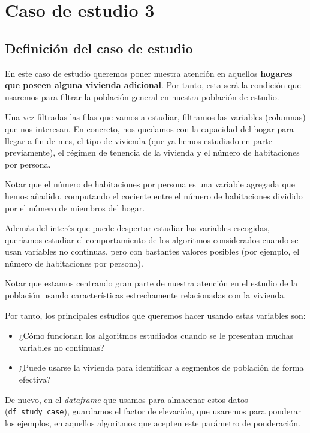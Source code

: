 \documentclass[11pt]{article}
\begin{document}
\pagebreak

\section{Caso de estudio 3}

\subsection{Definición del caso de estudio}

En este caso de estudio queremos poner nuestra atención en aquellos \textbf{hogares que poseen alguna vivienda adicional}. Por tanto, esta será la condición que usaremos para filtrar la población general en nuestra población de estudio.

Una vez filtradas las filas que vamos a estudiar, filtramos las variables (columnas) que nos interesan. En concreto, nos quedamos con la capacidad del hogar para llegar a fin de mes, el tipo de vivienda (que ya hemos estudiado en parte previamente), el régimen de tenencia de la vivienda y el número de habitaciones por persona.

Notar que el número de habitaciones por persona es una variable agregada que hemos añadido, computando el cociente entre el número de habitaciones dividido por el número de miembros del hogar.

Además del interés que puede despertar estudiar las variables escogidas, queríamos estudiar el comportamiento de los algoritmos considerados cuando se usan variables no continuas, pero con bastantes valores posibles (por ejemplo, el número de habitaciones por persona).

Notar que estamos centrando gran parte de nuestra atención en el estudio de la población usando características estrechamente relacionadas con la vivienda.

Por tanto, los principales estudios que queremos hacer usando estas variables son:

\begin{itemize}
    \item ¿Cómo funcionan los algoritmos estudiados cuando se le presentan muchas variables no continuas?
    \item ¿Puede usarse la vivienda para identificar a segmentos de población de forma efectiva?
\end{itemize}

De nuevo, en el \emph{dataframe} que usamos para almacenar estos datos (\lstinline{df_study_case}), guardamos el factor de elevación, que usaremos para ponderar los ejemplos, en aquellos algoritmos que acepten este parámetro de ponderación.
\end{document}
